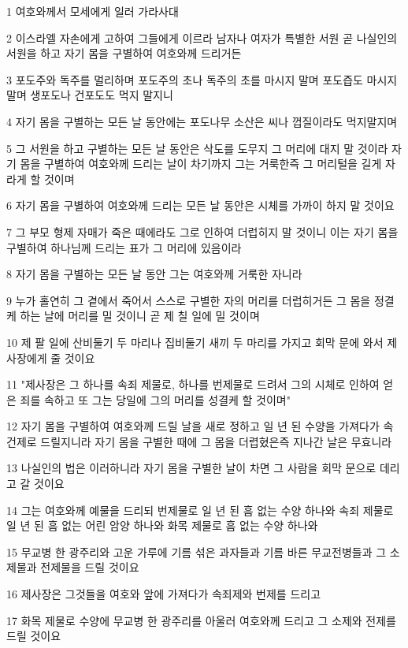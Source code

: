 \par 1 여호와께서 모세에게 일러 가라사대
\par 2 이스라엘 자손에게 고하여 그들에게 이르라 남자나 여자가 특별한 서원 곧 나실인의 서원을 하고 자기 몸을 구별하여 여호와께 드리거든
\par 3 포도주와 독주를 멀리하며 포도주의 초나 독주의 초를 마시지 말며 포도즙도 마시지 말며 생포도나 건포도도 먹지 말지니
\par 4 자기 몸을 구별하는 모든 날 동안에는 포도나무 소산은 씨나 껍질이라도 먹지말지며
\par 5 그 서원을 하고 구별하는 모든 날 동안은 삭도를 도무지 그 머리에 대지 말 것이라 자기 몸을 구별하여 여호와께 드리는 날이 차기까지 그는 거룩한즉 그 머리털을 길게 자라게 할 것이며
\par 6 자기 몸을 구별하여 여호와께 드리는 모든 날 동안은 시체를 가까이 하지 말 것이요
\par 7 그 부모 형제 자매가 죽은 때에라도 그로 인하여 더럽히지 말 것이니 이는 자기 몸을 구별하여 하나님께 드리는 표가 그 머리에 있음이라
\par 8 자기 몸을 구별하는 모든 날 동안 그는 여호와께 거룩한 자니라
\par 9 누가 홀연히 그 곁에서 죽어서 스스로 구별한 자의 머리를 더럽히거든 그 몸을 정결케 하는 날에 머리를 밀 것이니 곧 제 칠 일에 밀 것이며
\par 10 제 팔 일에 산비둘기 두 마리나 집비둘기 새끼 두 마리를 가지고 회막 문에 와서 제사장에게 줄 것이요
\par 11 "제사장은 그 하나를 속죄 제물로, 하나를 번제물로 드려서 그의 시체로 인하여 얻은 죄를 속하고 또 그는 당일에 그의 머리를 성결케 할 것이며"
\par 12 자기 몸을 구별하여 여호와께 드릴 날을 새로 정하고 일 년 된 수양을 가져다가 속건제로 드릴지니라 자기 몸을 구별한 때에 그 몸을 더렵혔은즉 지나간 날은 무효니라
\par 13 나실인의 법은 이러하니라 자기 몸을 구별한 날이 차면 그 사람을 회막 문으로 데리고 갈 것이요
\par 14 그는 여호와께 예물을 드리되 번제물로 일 년 된 흠 없는 수양 하나와 속죄 제물로 일 년 된 흠 없는 어린 암양 하나와 화목 제물로 흠 없는 수양 하나와
\par 15 무교병 한 광주리와 고운 가루에 기름 섞은 과자들과 기름 바른 무교전병들과 그 소제물과 전제물을 드릴 것이요
\par 16 제사장은 그것들을 여호와 앞에 가져다가 속죄제와 번제를 드리고
\par 17 화목 제물로 수양에 무교병 한 광주리를 아울러 여호와께 드리고 그 소제와 전제를 드릴 것이요
